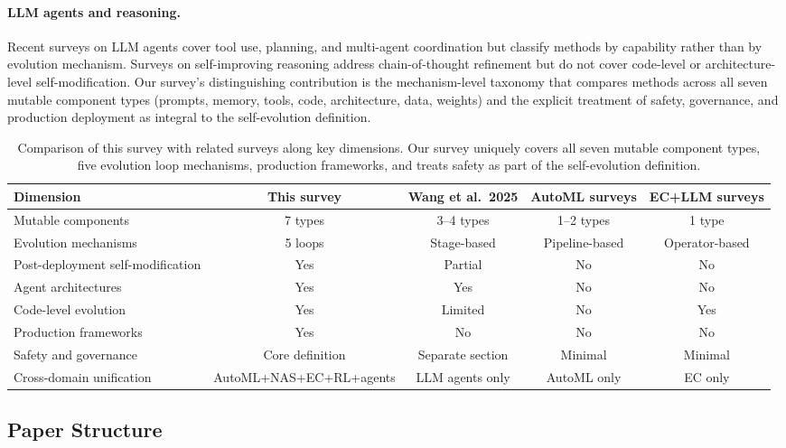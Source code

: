 \paragraph{LLM agents and reasoning.} Recent surveys on LLM agents \cite{xi2025riseagent,wang2024surveyagent} cover tool use, planning, and multi-agent coordination but classify methods by capability rather than by evolution mechanism. Surveys on self-improving reasoning \cite{huang2025selfimprove} address chain-of-thought refinement but do not cover code-level or architecture-level self-modification. Our survey's distinguishing contribution is the mechanism-level taxonomy that compares methods across all seven mutable component types (prompts, memory, tools, code, architecture, data, weights) and the explicit treatment of safety, governance, and production deployment as integral to the self-evolution definition.

\begin{table}[t]
\centering
{\TableTight
\begin{tabularx}{\textwidth}{@{}L{0.22\textwidth}cccc@{}}
\toprule
\textbf{Dimension} & \textbf{This survey} & \textbf{Wang et al.\ 2025} & \textbf{AutoML surveys} & \textbf{EC+LLM surveys} \\
\midrule
Mutable components & 7 types & 3--4 types & 1--2 types & 1 type \\
Evolution mechanisms & 5 loops & Stage-based & Pipeline-based & Operator-based \\
Post-deployment self-modification & Yes & Partial & No & No \\
Agent architectures & Yes & Yes & No & No \\
Code-level evolution & Yes & Limited & No & Yes \\
Production frameworks & Yes & No & No & No \\
Safety and governance & Core definition & Separate section & Minimal & Minimal \\
Cross-domain unification & AutoML+NAS+EC+RL+agents & LLM agents only & AutoML only & EC only \\
\bottomrule
\end{tabularx}}
\caption{Comparison of this survey with related surveys along key dimensions. Our survey uniquely covers all seven mutable component types, five evolution loop mechanisms, production frameworks, and treats safety as part of the self-evolution definition.}
\label{tab:survey-comparison}
\end{table}

\subsection{Paper Structure}
\label{subsec:intro-structure}

